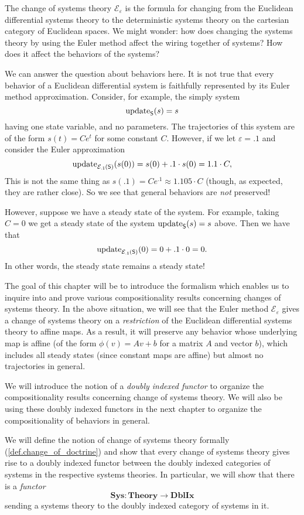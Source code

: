 \documentclass[DynamicalBook]{subfiles}
\begin{document}
The change of systems theory $\mathcal{E}_{\varepsilon}$ is the formula for changing from
the Euclidean differential systems theory to the deterministic systems theory on the
cartesian category of Euclidean spaces. We might wonder: how does changing the
systems theory by using the Euler method affect the wiring together of systems? How
does it affect the behaviors of the systems?

We can answer the question about behaviors here. It is not true that every
behavior of a Euclidean differential system is faithfully represented by its
Euler method approximation. Consider, for example, the simply system
\[
\mathrm{update}_{\mathsf{S}}(s) = s
\]
having one state variable, and no parameters. The trajectories of this system
are of the form $s(t) = Ce^t$ for some constant $C$. However, if we let
$\varepsilon = .1$ and consider the Euler approximation
\[
\mathrm{update}_{\mathsf{\mathcal{E}_{.1}(\mathsf{S})}}(s(0)) = s(0) + .1 \cdot s(0) = 1.1
\cdot C,
\]
This is not the same thing as $s(.1) = Ce^{.1} \approx 1.105 \cdot C$ (though,
as expected, they are rather close). So we see that general behaviors are
\emph{not} preserved!

However, suppose we have a steady state of the system. For example, taking $C =
0$ we get a steady state of the system $\mathrm{update}_{\mathsf{S}}(s) = s$ above. Then we have
that
\[
\mathrm{update}_{\mathsf{\mathcal{E}_{.1}(\mathsf{S})}}(0) = 0 + .1 \cdot 0 = 0.
\]
In other words, the steady state remains a steady state!

The goal of this chapter will be to introduce the formalism which enables us to
inquire into and prove various compositionality results concerning changes of
systems theory. In the above situation, we will see that the Euler method
$\mathcal{E}_{\varepsilon}$ gives a change of systems theory on a \emph{restriction} of
the Euclidean differential systems theory to affine maps. As a result, it will
preserve any behavior whose underlying map is affine (of the form $\phi(v) = Av
+ b$ for a matrix $A$ and vector $b$), which includes all steady states (since
constant maps are affine) but almost no trajectories in general.


We will introduce the notion of a \emph{doubly indexed functor} to organize the
compositionality results concerning change of systems theory. We will also be using
these doubly indexed functors in the next chapter to organize the
compositionality of behaviors in general.

We will define the notion of change of systems theory formally
(\cref{def.change_of_doctrine}) and show that every change of systems theory gives
rise to a doubly indexed functor between the doubly indexed categories of
systems in the respective systems theories. In particular, we will show that there is a
\emph{functor}
$$\textbf{Sys} : \textbf{Theory} \to \textbf{DblIx}$$
sending a systems theory to the doubly indexed category of systems in it.
\end{document}
